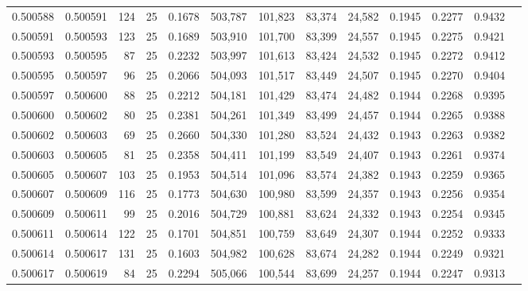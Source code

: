 \begin{tabular}{rrrrrrrrrrrrr}
0.500588 & 0.500591 & 124 &  25 &                                     0.1678 & 503,787 & 101,823 &  83,374 &  24,582 & 0.1945 & 0.2277 & 0.9432 \\
0.500591 & 0.500593 & 123 &  25 &                                     0.1689 & 503,910 & 101,700 &  83,399 &  24,557 & 0.1945 & 0.2275 & 0.9421 \\
0.500593 & 0.500595 &  87 &  25 &                                     0.2232 & 503,997 & 101,613 &  83,424 &  24,532 & 0.1945 & 0.2272 & 0.9412 \\
0.500595 & 0.500597 &  96 &  25 &                                     0.2066 & 504,093 & 101,517 &  83,449 &  24,507 & 0.1945 & 0.2270 & 0.9404 \\
0.500597 & 0.500600 &  88 &  25 &                                     0.2212 & 504,181 & 101,429 &  83,474 &  24,482 & 0.1944 & 0.2268 & 0.9395 \\
0.500600 & 0.500602 &  80 &  25 &                                     0.2381 & 504,261 & 101,349 &  83,499 &  24,457 & 0.1944 & 0.2265 & 0.9388 \\
0.500602 & 0.500603 &  69 &  25 &                                     0.2660 & 504,330 & 101,280 &  83,524 &  24,432 & 0.1943 & 0.2263 & 0.9382 \\
0.500603 & 0.500605 &  81 &  25 &                                     0.2358 & 504,411 & 101,199 &  83,549 &  24,407 & 0.1943 & 0.2261 & 0.9374 \\
0.500605 & 0.500607 & 103 &  25 &                                     0.1953 & 504,514 & 101,096 &  83,574 &  24,382 & 0.1943 & 0.2259 & 0.9365 \\
0.500607 & 0.500609 & 116 &  25 &                                     0.1773 & 504,630 & 100,980 &  83,599 &  24,357 & 0.1943 & 0.2256 & 0.9354 \\
0.500609 & 0.500611 &  99 &  25 &                                     0.2016 & 504,729 & 100,881 &  83,624 &  24,332 & 0.1943 & 0.2254 & 0.9345 \\
0.500611 & 0.500614 & 122 &  25 &                                     0.1701 & 504,851 & 100,759 &  83,649 &  24,307 & 0.1944 & 0.2252 & 0.9333 \\
0.500614 & 0.500617 & 131 &  25 &                                     0.1603 & 504,982 & 100,628 &  83,674 &  24,282 & 0.1944 & 0.2249 & 0.9321 \\
0.500617 & 0.500619 &  84 &  25 &                                     0.2294 & 505,066 & 100,544 &  83,699 &  24,257 & 0.1944 & 0.2247 & 0.9313 \\

\end{tabular}
